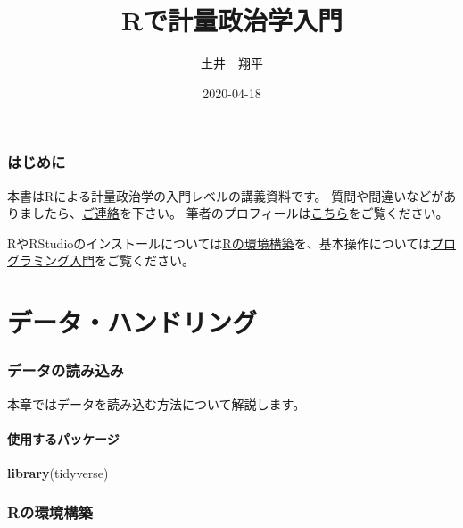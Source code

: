 \documentclass[]{bxjsarticle}
\title{Rで計量政治学入門}
\author{土井　翔平}
\date{2020-04-18}
\newenvironment{Shaded}{\begin{snugshade}}{\end{snugshade}}
\newcommand{\KeywordTok}[1]{\textcolor[rgb]{0.13,0.29,0.53}{\textbf{#1}}}
\newcommand{\NormalTok}[1]{#1}
\begin{document}
\maketitle

{
\setcounter{tocdepth}{2}
\tableofcontents
}
\hypertarget{index}{%
\section*{はじめに}\label{index}}

本書はRによる計量政治学の入門レベルの講義資料です。
質問や間違いなどがありましたら、\href{mailto:shohei.doi0504@gmail.com}{ご連絡}を下さい。
筆者のプロフィールは\href{https://shohei-doi.github.io/}{こちら}をご覧ください。

RやRStudioのインストールについては\protect\hyperlink{install-r}{Rの環境構築}を、基本操作については\protect\hyperlink{intro-r}{プログラミング入門}をご覧ください。

\hypertarget{part-ux30c7ux30fcux30bfux30cfux30f3ux30c9ux30eaux30f3ux30b0}{%
\part{データ・ハンドリング}\label{part-ux30c7ux30fcux30bfux30cfux30f3ux30c9ux30eaux30f3ux30b0}}

\hypertarget{data-import}{%
\section{データの読み込み}\label{data-import}}

本章ではデータを読み込む方法について解説します。

\hypertarget{ux4f7fux7528ux3059ux308bux30d1ux30c3ux30b1ux30fcux30b8}{%
\subsection{使用するパッケージ}\label{ux4f7fux7528ux3059ux308bux30d1ux30c3ux30b1ux30fcux30b8}}

\begin{Shaded}
\begin{Highlighting}[]
\KeywordTok{library}\NormalTok{(tidyverse)}
\end{Highlighting}
\end{Shaded}

\hypertarget{appendix-ux88dcux8ad6}{%
\appendix}


\hypertarget{install-r}{%
\section{Rの環境構築}\label{install-r}}
\end{document}
